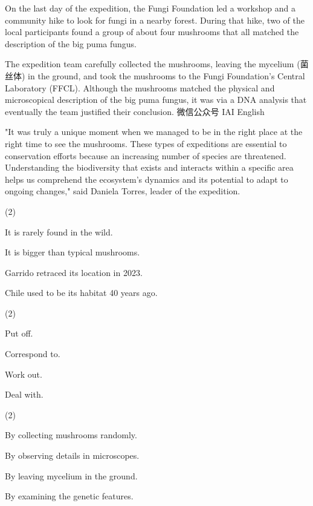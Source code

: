 \documentclass{英语试卷}
\begin{document}
\par On the last day of the expedition, the Fungi Foundation led a workshop and a community hike to look for fungi in a nearby forest. During that hike, two of the local participants found a group of about four mushrooms that all matched the description of the big puma fungus.\par
\par The expedition team carefully collected the mushrooms, leaving the mycelium (菌丝体) in the ground, and took the mushrooms to the Fungi Foundation's Central Laboratory (FFCL). Although the mushrooms matched the physical and microscopical description of the big puma fungus, it was via a DNA analysis that eventually the team justified their conclusion. 微信公众号 IAI English\par
\par "It was truly a unique moment when we managed to be in the right place at the right time to see the mushrooms. These types of expeditions are essential to conservation efforts because an increasing number of species are threatened. Understanding the biodiversity that exists and interacts within a specific area helps us comprehend the ecosystem's dynamics and its potential to adapt to ongoing changes," said Daniela Torres, leader of the expedition.\par
{}
\begin{choices}(2)
  \item It is rarely found in the wild.
  \item It is bigger than typical mushrooms.
  \item Garrido retraced its location in 2023.
  \item Chile used to be its habitat 40 years ago.
\end{choices}
\begin{choices}(2)
  \item Put off.
  \item Correspond to.
  \item Work out.
  \item Deal with.
\end{choices}
\begin{choices}(2)
  \item By collecting mushrooms randomly.
  \item By observing details in microscopes.
  \item By leaving mycelium in the ground.
  \item By examining the genetic features.
\end{choices}
\end{document}
